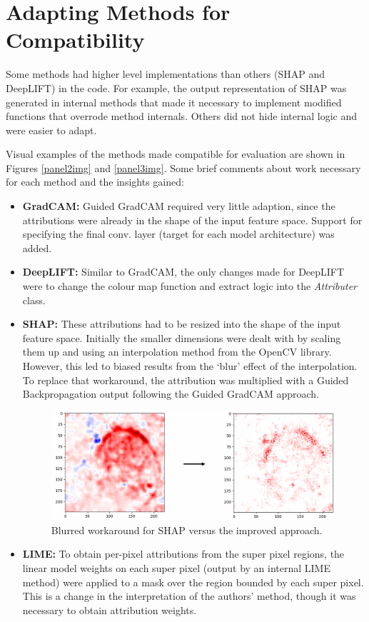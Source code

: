 \documentclass[main]{subfiles}
\begin{document}
\newpage
\section{Adapting Methods for Compatibility}  \label{sec:adaption}

Some methods had higher level implementations than others (SHAP and DeepLIFT) in the code. For example, the output representation of SHAP was generated in internal methods that made it necessary to implement modified functions that overrode method internals. Others did not hide internal logic and were easier to adapt.

Visual examples of the methods made compatible for evaluation are shown in Figures \ref{panel2img} and \ref{panel3img}. Some brief comments  about work necessary for each method and the insights gained:

\begin{itemize}
\item \textbf{GradCAM:} Guided GradCAM required very little adaption, since the attributions were already in the shape of the input feature space. Support for specifying the final conv. layer (target for each model architecture) was added.
\item \textbf{DeepLIFT:} Similar to GradCAM, the only changes made for DeepLIFT were to change the colour map function and extract logic into the \textit{Attributer} class.
\item \textbf{SHAP:} These attributions had to be resized into the shape of the input feature space. Initially the smaller dimensions were dealt with by scaling them up and using an interpolation method from the OpenCV library. However, this led to biased results from the `blur' effect of the interpolation. To replace that workaround, the attribution was multiplied with a Guided Backpropagation output following the Guided GradCAM approach.
\begin{figure}[htbp]
\centering
\includegraphics[scale=0.3]{shap_change.png}
\caption{Blurred workaround for SHAP versus the improved approach.}
\label{panelimg}
\end{figure}


\item \textbf{LIME:} To obtain per-pixel attributions from the super pixel regions, the linear model weights on each super pixel (output by an internal LIME method) were applied to a mask over the region bounded by each super pixel. This is a change in the interpretation of the authors' method, though it was necessary to obtain attribution weights.
\end{itemize}
\end{document}
